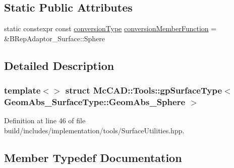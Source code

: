 \subsection*{Static Public Attributes}
\begin{DoxyCompactItemize}
\item 
static constexpr const \hyperlink{structMcCAD_1_1Tools_1_1gpSurfaceType_3_01GeomAbs__SurfaceType_1_1GeomAbs__Sphere_01_4_a4a908dc9b85bfc9f6ec822daf9608b5e}{conversion\+Type} \hyperlink{structMcCAD_1_1Tools_1_1gpSurfaceType_3_01GeomAbs__SurfaceType_1_1GeomAbs__Sphere_01_4_a2d75bca056002fb224d499a1c3b64dd6}{conversion\+Member\+Function} = \&B\+Rep\+Adaptor\+\_\+\+Surface\+::\+Sphere
\end{DoxyCompactItemize}


\subsection{Detailed Description}
\subsubsection*{template$<$$>$\newline
struct Mc\+C\+A\+D\+::\+Tools\+::gp\+Surface\+Type$<$ Geom\+Abs\+\_\+\+Surface\+Type\+::\+Geom\+Abs\+\_\+\+Sphere $>$}



Definition at line 46 of file build/includes/implementation/tools/\+Surface\+Utilities.\+hpp.



\subsection{Member Typedef Documentation}
\mbox{\label{structMcCAD_1_1Tools_1_1gpSurfaceType_3_01GeomAbs__SurfaceType_1_1GeomAbs__Sphere_01_4_a4a908dc9b85bfc9f6ec822daf9608b5e}} 
